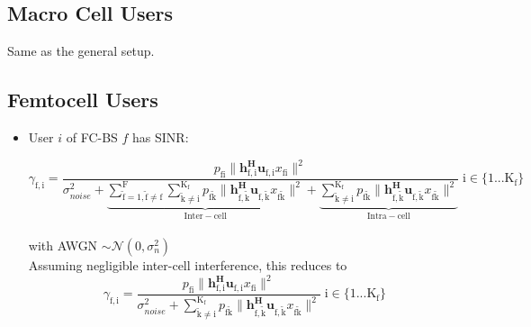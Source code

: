 \documentclass[12pt,a4paper]{report}
\begin{document}
\subsection{Macro Cell Users}
Same as the general setup.

\subsection{Femtocell Users}
\begin{itemize}



\item User $i$ of FC-BS $f$ has SINR:

	\begin{equation*}
	\gamma_{\mathrm{f,i}} = 
	\frac{p_{\mathrm{fi}}\|\mathbf{h^H_{\mathrm{f,i}}u_{\mathrm{f,i}}}x_{\mathrm{fi}}\|^2}
	{\sigma^2_{noise}   +
	\underbrace{
	\sum_{\mathrm{\tilde{f}=1,\tilde{f} \neq f}}^{\mathrm{F}}
	\sum_{\mathrm{\tilde{k}\neq i}}^{\mathrm{K_f}}
	  p_{\mathrm{f\tilde{k}}}\|\mathbf{h^H_{\mathrm{f,\tilde{k}}}u_{\mathrm{f,\tilde{k}}}}x_{\mathrm{f\tilde{k}}}\|^2}_
	  {\mathrm{Inter-cell}}+ \underbrace{
	\sum_{\mathrm{\tilde{k}\neq i}}^{\mathrm{K_f}}
	  p_{\mathrm{f\tilde{k}}}\|\mathbf{h^H_{\mathrm{f,\tilde{k}}}u_{\mathrm{f,\tilde{k}}}}x_{\mathrm{f\tilde{k}}}\|^2}
	 _{\mathrm{Intra-cell}}}
	  \; \mathrm{i \in \{1 ... K_f\}}\end{equation*}
\\
with AWGN $\sim \mathcal{N}(0,\sigma^2_n)$
\\

Assuming negligible inter-cell interference, this reduces to
	\begin{equation*}
	\gamma_{\mathrm{f,i}} = \frac{p_{\mathrm{fi}}\|\mathbf{h^H_{\mathrm{f,i}}
	u_{\mathrm{f,i}}}x_{\mathrm{fi}}\|^2}
	{\sigma^2_{noise} 
	 + \sum_{\mathrm{\tilde{k}\neq i}}^{\mathrm{K_f}}
	  p_{\mathrm{f\tilde{k}}}\|\mathbf{h^H_{\mathrm{f,\tilde{k}}}u_{\mathrm{f,\tilde{k}}}}x_{\mathrm{f\tilde{k}}}\|^2}
	  \; \mathrm{i \in \{1 ... K_f\}}
	\end{equation*}
\\

%

\end{itemize}
\end{document}

